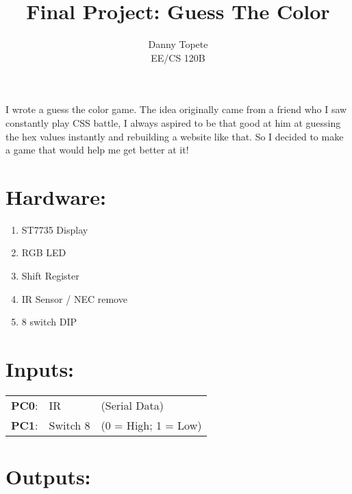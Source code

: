 \documentclass[12pt]{article}
\begin{document}
 
 
\title{Final Project: Guess The Color}
\author{Danny Topete\\ %
EE/CS 120B}

\maketitle

\doublespacing

I wrote a guess the color game. The idea originally came from a friend who I saw constantly play CSS battle,
I always aspired to be that good at him at guessing the hex values instantly and rebuilding a website like that.
So I decided to make a game that would help me get better at it!
\pagebreak
\section{Hardware:}
\begin{enumerate}
  \item ST7735 Display
  \item RGB LED
  \item Shift Register
  \item IR Sensor / NEC remove
  \item 8 switch DIP
\end{enumerate}

\section{Inputs:}

\begin{tabular}{ l l l }
   \textbf{PC0}: & IR & \quad (Serial Data) \\
   \textbf{PC1}: & Switch 8 & \quad (0 = High; 1 = Low) \\
\end{tabular}

\section{Outputs:}
\end{document}
